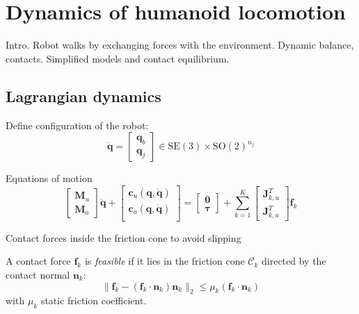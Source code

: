 \chapter{Dynamics of humanoid locomotion}
Intro. Robot walks by exchanging forces with the environment. Dynamic balance, contacts. Simplified models and contact equilibrium.

\section{Lagrangian dynamics}
\label{sec:lagrangian-dynamics}
Define configuration of the robot:
\begin{equation*}
    \ddot{\bm{q}} =
    \begin{bmatrix}
        \bm{q}_b \\ \bm{q}_j
    \end{bmatrix} \in \mathrm{SE}(3) \times \mathrm{SO}(2)^{n_j}
\end{equation*}

Equations of motion
\begin{equation}
    \begin{bmatrix}
        \bm{M}_u \\ \bm{M}_a
    \end{bmatrix} \ddot{\bm{q}} +
    \begin{bmatrix}
        \bm{c}_u(\bm{q}, \dot{\bm{q}}) \\
        \bm{c}_a(\bm{q}, \dot{\bm{q}}) \\
    \end{bmatrix} =
    \begin{bmatrix}
        \bm{0} \\ \bm{\tau}
    \end{bmatrix} +
    \sum_{k=1}^{K}
    \begin{bmatrix}
        \bm{J}_{k, u}^T \\ \bm{J}_{k, a}^T
    \end{bmatrix}
    \bm{f}_k
    \label{eq:equation-of-motion-humanoids}
\end{equation}

Contact forces inside the friction cone to avoid slipping

A contact force $\bm{f}_k$ is \textit{feasible} if it lies in the friction cone $\mathcal{C}_k$ directed by the contact normal $\bm{n}_k$:
\begin{equation*}
    \| \bm{f}_k - (\bm{f}_k \cdot \bm{n}_k) \bm{n}_k \|_2 \le \mu_k (\bm{f}_k \cdot \bm{n}_k)
\end{equation*}
with $\mu_k$ static friction coefficient.

